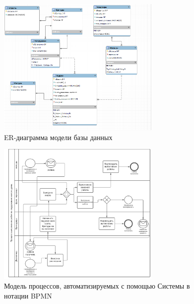 \begin{figure}[h]
\centering
\includegraphics[width=0.7\textwidth]{Images/model.png}
\caption{ER-диаграмма модели базы данных}
\end{figure}


\begin{figure}[h]
\centering
\includegraphics[width=0.7\textwidth]{Images/process.png}
\caption{Модель процессов, автоматизируемых с помощью Системы в нотации BPMN}
\end{figure}


